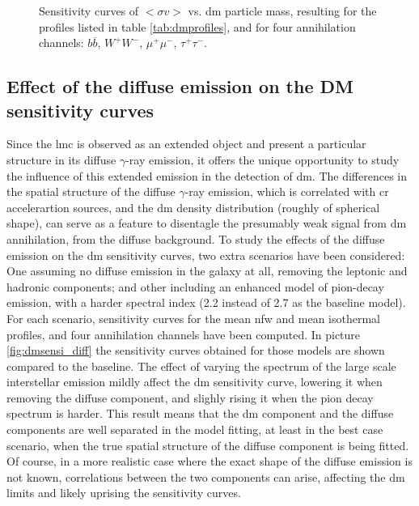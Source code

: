 \documentclass[main.tex]{subfiles}
\begin{document}
\begin{figure}[h!]
\endminipage
  \caption{Sensitivity curves of $<\sigma v >$ vs. \gls{dm} particle mass, resulting for the profiles listed in table \ref{tab:dmprofiles}, and for four annihilation channels: $b\overline b$, $W^+W^-$, $\mu^+ \mu^-$, $\tau^+ \tau^-$.}
    \label{fig:dmsensicurves}
\end{figure}

\subsection{Effect of the diffuse emission on the DM sensitivity curves}  \label{sec:dm:diff}

Since the \gls{lmc} is observed as an extended object and present a particular structure in its diffuse $\gamma$-ray emission, it offers the unique opportunity to study the influence of this extended emission in the detection of \gls{dm}. The differences in the spatial structure of the diffuse $\gamma$-ray emission,  which is correlated with \gls{cr} accelerartion sources, and the \gls{dm} density distribution (roughly of spherical shape), can serve as a feature to disentagle the presumably weak signal from \gls{dm} annihilation, from the diffuse background. To study the effects of the diffuse emission on the \gls{dm} sensitivity curves, two extra scenarios have been considered: One assuming no diffuse emission in the galaxy at all, removing the leptonic and hadronic components; and other including an enhanced model of pion-decay emission, with a harder spectral index (2.2 instead of 2.7 as the baseline model). For each scenario, sensitivity curves for the mean \gls{nfw} and mean isothermal profiles, and four annihilation channels have been computed. In picture \ref{fig:dmsensi_diff} the sensitivity curves obtained for those models are shown compared to the baseline. The effect of varying the spectrum of the large scale interstellar emission mildly affect the \gls{dm} sensitivity curve, lowering it when removing the diffuse component, and slighly rising it when the pion decay spectrum is harder. This result means that the \gls{dm} component and the diffuse components are well separated in the model fitting, at least in the best case scenario, when the true spatial structure of the diffuse component is being fitted. Of course, in a more realistic case where the exact shape of the diffuse emission is not known, correlations between the two components can arise, affecting the \gls{dm} limits and likely uprising the sensitivity curves.  
\end{document}
